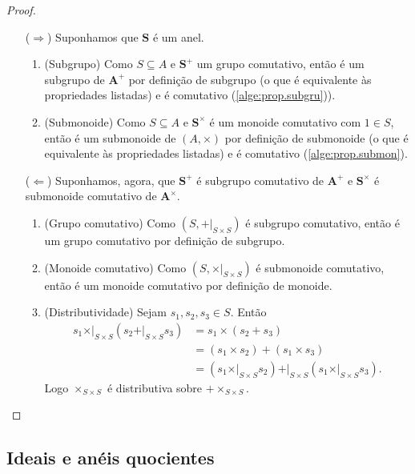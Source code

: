 \begin{proof}
	\begin{itemize}
	\item [($\Rightarrow$)] Suponhamos que $\bm S$ é um anel.
		\begin{enumerate}
		\item (Subgrupo) Como $S \subseteq A$ e $\bm S^+$ um grupo comutativo, então é um subgrupo de $\bm A^+$ por definição de subgrupo (o que é equivalente às propriedades listadas) e é comutativo (\ref{alge:prop.subgru})).
		
		\item (Submonoide) Como $S \subseteq A$ e $\bm S^\times$ é um monoide comutativo com $1 \in S$, então é um submonoide de $(A,\times)$ por definição de submonoide (o que é equivalente às propriedades listadas) e é comutativo (\ref{alge:prop.submon}).
		\end{enumerate}

	\item [($\Leftarrow$)] Suponhamos, agora, que $\bm S^+$ é subgrupo comutativo de $\bm A^+$ e $\bm S^\times$ é submonoide comutativo de $\bm A^\times$.
		\begin{enumerate}
		\item (Grupo comutativo) Como $(S,+|_{S \times S})$ é subgrupo comutativo, então é um grupo comutativo por definição de subgrupo.
		
		\item (Monoide comutativo) Como $(S,\times|_{S \times S})$ é submonoide comutativo, então é um monoide comutativo por definição de monoide.
		
		\item (Distributividade) Sejam $s_1,s_2,s_3 \in S$. Então
	\begin{align*}
	s_1 \mathrel{\times|_{S \times S}} (s_2 \mathrel{+|_{S \times S}} s_3) &= s_1 \times (s_2 + s_3) \\
		&= (s_1 \times s_2) + (s_1 \times s_3) \\
		&= (s_1 \mathrel{\times|_{S \times S}} s_2) \mathrel{+|_{S \times S}} (s_1 \mathrel{\times|_{S \times S}} s_3).
	\end{align*}
Logo $\times_{S \times S}$ é distributiva sobre $+ \times_{S \times S}$.
		\end{enumerate}
	\end{itemize}
\end{proof}

\subsection{Ideais e anéis quocientes}

